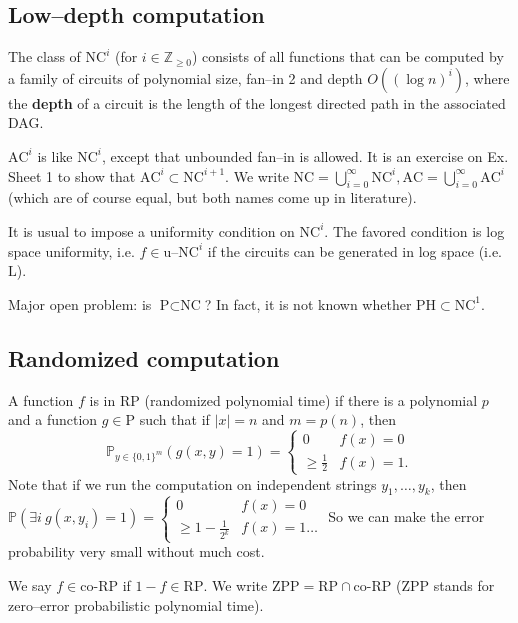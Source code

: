 \documentclass{article}
\theoremstyle{definition}
\begin{document}
\subsection{Low--depth computation}
The class of $\text{NC}^i$ (for $i \in \mathbb{Z}_{\ge 0}$) consists of all functions that can be computed by a family of circuits of polynomial size, fan--in 2 and depth $O((\log n)^i)$, where the \textbf{depth} of a circuit is the length of the longest directed path in the associated DAG.
\vspace{1mm}
 
$\text{AC}^i$ is like $\text{NC}^i$, except that unbounded fan--in is allowed. It is an exercise on Ex. Sheet 1 to show that $\text{AC}^i \subset \text{NC}^{i+1}$.
We write $\text{NC} = \bigcup_{i=0}^{\infty} \text{NC}^i, \text{AC} = \bigcup_{i=0}^{\infty} \text{AC}^i$ (which are of course equal, but both names come up in literature).
\vspace{1mm}
 
It is usual to impose a uniformity condition on $\text{NC}^i$. The favored condition is log space uniformity, i.e. $f \in \text{u--NC}^i$ if the circuits can be generated in log space (i.e. $\text{L}$).
\vspace{1mm}
 
Major open problem: is $\text{P} \subset \text{NC}$? In fact, it is not known whether $\text{PH} \subset \text{NC}^1$.

\subsection{Randomized computation}
A function $f$ is in $\text{RP}$ (randomized polynomial time) if there is a polynomial $p$ and a function $g \in \text{P}$ such that if $\left|x\right|=n$ and $m = p(n)$, then \[
\mathbb{P}_{y \in \{0,1\}^m}\left(g(x,y)=1\right) = \begin{cases}
    0 & f(x)=0\\
    \ge \frac{1}{2}&f(x)=1.
\end{cases}
\]
Note that if we run the computation on independent strings $y_1,\ldots,y_k$, then $\mathbb{P}(\exists i~g(x,y_i)=1) = \begin{cases}
    0 & f(x)=0\\
    \ge 1-\frac{1}{2^k}&f(x)=1\ldots
\end{cases}$
So we can make the error probability very small without much cost.
\vspace{1mm}
 
We say $f \in \text{co-RP}$ if $1-f \in\text{RP}$. We write $\text{ZPP} = \text{RP} \cap \text{co-RP}$ ($\text{ZPP}$ stands for zero--error probabilistic polynomial time). 
\vspace{1mm}
 
\end{document}
